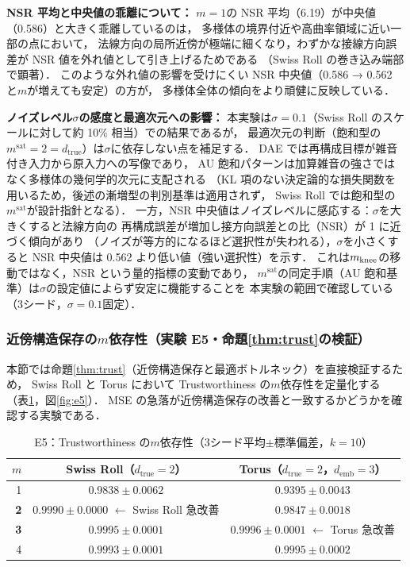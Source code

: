 \documentclass[12pt,a4paper]{jsarticle}
\newcommand{\dtrue}{d_{\mathrm{true}}}
\newcommand{\dzsat}{m^{\mathrm{sat}}}       %
\newcommand{\demb}{d_{\mathrm{emb}}}
\begin{document}
\textbf{NSR 平均と中央値の乖離について：}
$m=1$の NSR 平均（6.19）が中央値（0.586）と大きく乖離しているのは，
多様体の境界付近や高曲率領域に近い一部の点において，
法線方向の局所近傍が極端に細くなり，わずかな接線方向誤差が
NSR 値を外れ値として引き上げるためである
（Swiss Roll の巻き込み端部で顕著）．
このような外れ値の影響を受けにくい NSR 中央値（0.586 → 0.562 と$m$が増えても安定）の方が，
多様体全体の傾向をより頑健に反映している．

\textbf{ノイズレベル$\sigma$の感度と最適次元への影響：}
本実験は$\sigma = 0.1$（Swiss Roll のスケールに対して約 10\% 相当）での結果であるが，
最適次元の判断（飽和型の$\dzsat = 2 = \dtrue$）は$\sigma$に依存しない点を補足する．
DAE では再構成目標が雑音付き入力から原入力への写像であり，
AU 飽和パターンは加算雑音の強さではなく多様体の幾何学的次元に支配される
（KL 項のない決定論的な損失関数を用いるため，後述の漸増型の判別基準は適用されず，
Swiss Roll では飽和型の$\dzsat$が設計指針となる）．
一方，NSR 中央値はノイズレベルに感応する：$\sigma$を大きくすると法線方向の
再構成誤差が増加し接方向誤差との比（NSR）が 1 に近づく傾向があり
（ノイズが等方的になるほど選択性が失われる），$\sigma$を小さくすると
NSR 中央値は 0.562 より低い値（強い選択性）を示す．
これは$m_{\rm knee}$の移動ではなく，NSR という量的指標の変動であり，
$\dzsat$の同定手順（AU 飽和基準）は$\sigma$の設定値によらず安定に機能することを
本実験の範囲で確認している（3シード，$\sigma = 0.1$固定）．

\subsubsection{近傍構造保存の$m$依存性（実験 E5・命題\ref{thm:trust}の検証）}\label{sec:exp_e5}

本節では命題\ref{thm:trust}（近傍構造保存と最適ボトルネック）を直接検証するため，
Swiss Roll と Torus において Trustworthiness の$m$依存性を定量化する
（表\ref{tab:e5}，図\ref{fig:e5}）．
MSE の急落が近傍構造保存の改善と一致するかどうかを確認する実験である．

\begin{table}[H]
\centering
\caption{E5：Trustworthiness の$m$依存性（3シード平均$\pm$標準偏差，$k=10$）}
\label{tab:e5}
\begin{tabular}{rcc}
\toprule
$m$ & Swiss Roll（$\dtrue = 2$） & Torus（$\dtrue = 2$，$\demb = 3$） \\
\midrule
1 & $0.9838\pm0.0062$ & $0.9395\pm0.0043$ \\
\textbf{2} & $\boldsymbol{0.9990\pm0.0000}$ $\leftarrow$ Swiss Roll 急改善 & $0.9847\pm0.0018$ \\
\textbf{3} & $0.9995\pm0.0001$ & $\boldsymbol{0.9996\pm0.0001}$ $\leftarrow$ Torus 急改善 \\
4 & $0.9993\pm0.0001$ & $0.9995\pm0.0002$ \\
\bottomrule
\end{tabular}
\end{table}
\end{document}
